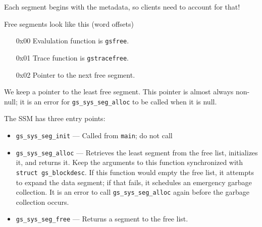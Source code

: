 \documentclass{article}
\newcommand\textc[1]{\texttt{#1}}
\begin{document}
Each segment begins with the metadata, so clients need to account for that!

Free segments look like this (word offsets)

\begin{itemize}
    \item[0x00] Evalulation function is \textc{gsfree}.
    \item[0x01] Trace function is \textc{gstracefree}.
    \item[0x02] Pointer to the next free segment.
\end{itemize}

We keep a pointer to the least free segment.
This pointer is almost always non-null; it is an error for \textc{gs\_sys\_seg\_alloc} to be called when it is null.

The SSM has three entry points:
\begin{itemize}
    \item \textc{gs\_sys\_seg\_init} --- Called from \textc{main}; do not call
    \item \textc{gs\_sys\_seg\_alloc} --- Retrieves the least segment from the free list, initializes it, and returns it.
        Keep the arguments to this function synchronized with \textc{struct gs\_blockdesc}.
        If this function would empty the free list, it attempts to expand the data segment; if that fails, it schedules an emergency garbage collection.
        It is an error to call \textc{gs\_sys\_seg\_alloc} again before the garbage collection occurs.
    \item \textc{gs\_sys\_seg\_free} --- Returns a segment to the free list.
\end{itemize}
\end{document}
